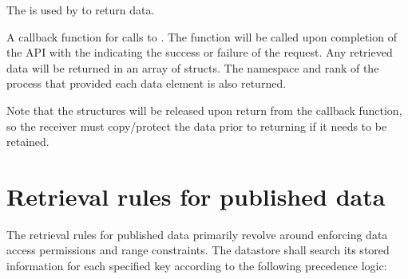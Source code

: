 \summary

The  is used by  to return data.


\begin{arglist}
\end{arglist}


\descr

A callback function for calls to .
The function will be called upon completion of the  \ac{API} with the  indicating the success or failure of the request.
Any retrieved data will be returned in an array of  structs.
The namespace and rank of the process that provided each data element is also returned.

Note that the  structures will be released upon return from the callback function, so the receiver must copy/protect the data prior to returning if it needs to be retained.


\section{Retrieval rules for published data}
\label{chap:pub:retrules}

The retrieval rules for published data primarily revolve around enforcing data access permissions and range constraints. The datastore shall search its stored information for each specified key according to the following precedence logic:

